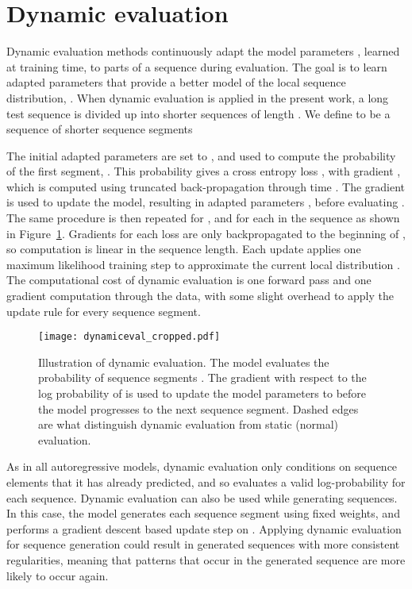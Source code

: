 \documentclass{article} \usepackage{iclr2018_conference,times}
\begin{document}
\section{Dynamic evaluation}
\label{sec:dyneval}

Dynamic evaluation methods continuously adapt the model parameters , learned at training time, to parts of a sequence during evaluation. The goal is to learn adapted parameters  that provide a better model of the local sequence distribution, . When dynamic evaluation is applied in the present work, a long test sequence  is divided up into shorter sequences of length . We define  to be a sequence of shorter sequence segments 
  
The initial adapted parameters  are set to , and used to compute the probability of the first segment, . This probability gives a cross entropy loss , with gradient , which is computed using truncated back-propagation through time \citep{werbos-1990}. The gradient  is used to update the model, resulting in adapted parameters , before evaluating . The same procedure is then repeated for , and for each  in the sequence as shown in Figure~\ref{fig:dynamiceval}. Gradients for each loss  are only backpropagated to the beginning of , so computation is linear in the sequence length. Each update applies one maximum likelihood training step to approximate the current local distribution . The computational cost of dynamic evaluation is one forward pass and one gradient computation through the data, with some slight overhead to apply the update rule for every sequence segment.



\begin{figure}[tb]
  \centering
  \texttt{[image: dynamiceval\_cropped.pdf]}
  \caption{Illustration of dynamic evaluation. The model evaluates the probability of sequence segments . The gradient  with respect to the log probability of  is used to update the model parameters  to  before the model progresses to the next sequence segment. Dashed edges are what distinguish dynamic evaluation from static (normal) evaluation.  }
  \label{fig:dynamiceval}
\end{figure}

As in all autoregressive models, dynamic evaluation only conditions on sequence elements that it has already predicted, and so evaluates a valid log-probability for each sequence. Dynamic evaluation can also be used while generating sequences. In this case, the model generates each sequence segment  using fixed weights, and performs a gradient descent based update step on . Applying dynamic evaluation for sequence generation could result in generated sequences with more consistent regularities, meaning that patterns that occur in the generated sequence are more likely to occur again.
\end{document}
